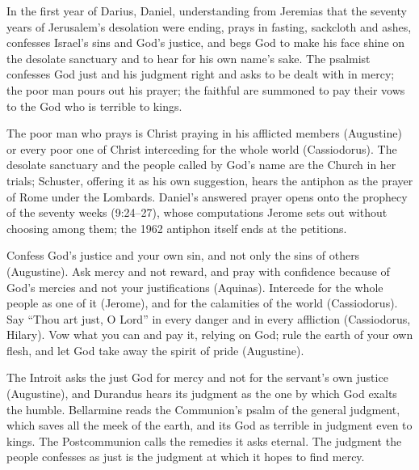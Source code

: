 \begin{fourSenses}
\item[Literal.] In the first year of Darius, Daniel, understanding from
Jeremias that the seventy years of Jerusalem's desolation were ending, prays in
fasting, sackcloth and ashes, confesses Israel's sins and God's justice, and
begs God to make his face shine on the desolate sanctuary and to hear for his
own name's sake. The psalmist confesses God just and his judgment right and
asks to be dealt with in mercy; the poor man pours out his prayer; the
faithful are summoned to pay their vows to the God who is terrible to kings.

\item[Allegorical.] The poor man who prays is Christ praying in his afflicted
members (Augustine) or every poor one of Christ interceding for the whole
world (Cassiodorus). The desolate sanctuary and the people called by God's
name are the Church in her trials; Schuster, offering it as his own
suggestion, hears the antiphon as the prayer of Rome under the Lombards. Daniel's answered prayer
opens onto the prophecy of the seventy weeks (9:24--27), whose computations
Jerome sets out without choosing among them; the 1962 antiphon itself ends at
the petitions.

\item[Moral.] Confess God's justice and your own sin, and not only the sins of
others (Augustine). Ask mercy and not reward, and pray with confidence
because of God's mercies and not your justifications (Aquinas). Intercede for
the whole people as one of it (Jerome), and for the calamities of the world
(Cassiodorus). Say ``Thou art just, O Lord'' in every danger and in every
affliction (Cassiodorus, Hilary). Vow what you can and pay it, relying on God;
rule the earth of your own flesh, and let God take away the spirit of pride
(Augustine).

\item[Anagogical.] The Introit asks the just God for mercy and not for the
servant's own justice (Augustine), and Durandus hears its judgment as the one
by which God exalts the humble.
Bellarmine reads the Communion's psalm of the general judgment, which saves
all the meek of the earth, and its God as terrible in judgment even to kings.
The Postcommunion calls the remedies it asks eternal. The judgment the
people confesses as just is the judgment at which it hopes to find mercy.
\end{fourSenses}
